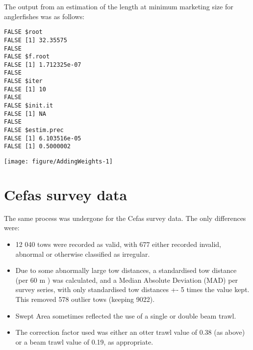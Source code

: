 \documentclass[12pt]{article}\usepackage[]{graphicx}\usepackage[]{color}
\makeatletter
\def\maxwidth{ %
  \ifdim\Gin@nat@width>\linewidth
    \linewidth
  \else
    \Gin@nat@width
  \fi
}
\newenvironment{kframe}{%
 \def\at@end@of@kframe{}%
 \ifinner\ifhmode%
  \def\at@end@of@kframe{\end{minipage}}%
  \begin{minipage}{\columnwidth}%
 \fi\fi%
 \def\FrameCommand##1{\hskip\@totalleftmargin \hskip-\fboxsep
 \colorbox{shadecolor}{##1}\hskip-\fboxsep
     \hskip-\linewidth \hskip-\@totalleftmargin \hskip\columnwidth}%
 \MakeFramed {\advance\hsize-\width
   \@totalleftmargin\z@ \linewidth\hsize
   \@setminipage}}%
 {\par\unskip\endMakeFramed%
 \at@end@of@kframe}
\newenvironment{knitrout}{}{} %
\makeatother
\begin{document}
The output from an estimation of the length at minimum marketing size for
anglerfishes was as follows:

\begin{knitrout}\footnotesize
{}\color{fgcolor}\begin{kframe}
\begin{verbatim}
FALSE $root
FALSE [1] 32.35575
FALSE 
FALSE $f.root
FALSE [1] 1.712325e-07
FALSE 
FALSE $iter
FALSE [1] 10
FALSE 
FALSE $init.it
FALSE [1] NA
FALSE 
FALSE $estim.prec
FALSE [1] 6.103516e-05
FALSE [1] 0.5000002
\end{verbatim}
\end{kframe}

{\centering \texttt{[image: figure/AddingWeights-1]} 

}


\begin{kframe}

{\ttfamily\noindent\itshape{}}\end{kframe}
\end{knitrout}

\section{Cefas survey data}

The same process was undergone for the Cefas survey data. The only differences
were:

\begin{itemize}
	\item 12 040 tows were recorded as valid, with 677 either recorded
		invalid, abnormal or otherwise classified as irregular.
	\item Due to some abnormally large tow distances, a standardised tow
		distance (per 60 m ) was calculated, and a Median Absolute
		Deviation (MAD) per survey series, with only standardised tow
		distances +- 5 times the value kept. This removed 578 outlier
		tows (keeping 9022).
	\item Swept Area sometimes reflected the use of a single or double beam
		trawl.
	\item The correction factor used was either an otter trawl value of
		0.38 (as above) or a beam trawl value of 0.19, as appropriate.
\end{itemize}
\end{document}

